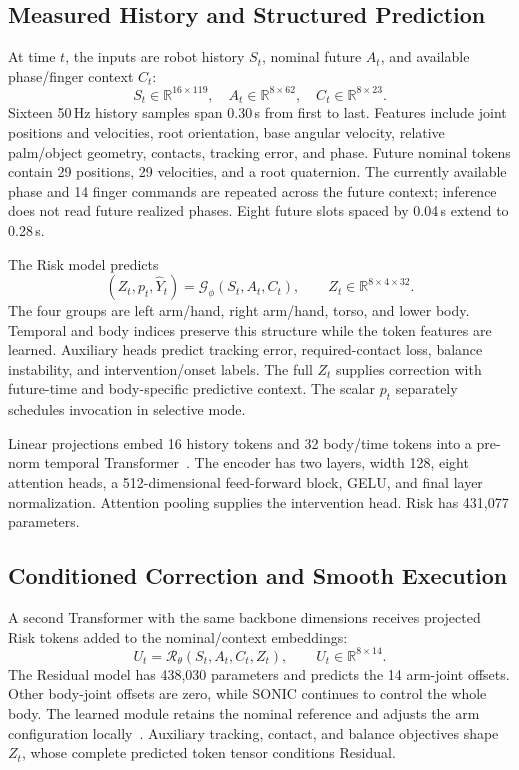 \documentclass[letterpaper,10pt,conference]{ieeeconf}
\newcommand{\Risk}{\mathcal{G}_{\phi}}
\newcommand{\Res}{\mathcal{R}_{\theta}}
\begin{document}
\subsection{Measured History and Structured Prediction}
At time $t$, the inputs are robot history $S_t$, nominal future $A_t$, and available phase/finger context $C_t$:
\begin{equation}
 S_t\in\mathbb{R}^{16\times119},\quad
 A_t\in\mathbb{R}^{8\times62},\quad
 C_t\in\mathbb{R}^{8\times23}.
\end{equation}
Sixteen 50\,Hz history samples span 0.30\,s from first to last. Features include joint positions and velocities, root orientation, base angular velocity, relative palm/object geometry, contacts, tracking error, and phase. Future nominal tokens contain 29 positions, 29 velocities, and a root quaternion. The currently available phase and 14 finger commands are repeated across the future context; inference does not read future realized phases. Eight future slots spaced by 0.04\,s extend to 0.28\,s.

The Risk model predicts
\begin{equation}
 (Z_t,p_t,\widehat{Y}_t)=\Risk(S_t,A_t,C_t),\qquad
 Z_t\in\mathbb{R}^{8\times4\times32}.
 \label{eq:risk}
\end{equation}
The four groups are left arm/hand, right arm/hand, torso, and lower body. Temporal and body indices preserve this structure while the token features are learned. Auxiliary heads predict tracking error, required-contact loss, balance instability, and intervention/onset labels. The full $Z_t$ supplies correction with future-time and body-specific predictive context. The scalar $p_t$ separately schedules invocation in selective mode.

Linear projections embed 16 history tokens and 32 body/time tokens into a pre-norm temporal Transformer~\cite{transformer}. The encoder has two layers, width 128, eight attention heads, a 512-dimensional feed-forward block, GELU, and final layer normalization. Attention pooling supplies the intervention head. Risk has 431,077 parameters.

\subsection{Conditioned Correction and Smooth Execution}
A second Transformer with the same backbone dimensions receives projected Risk tokens added to the nominal/context embeddings:
\begin{equation}
 U_t=\Res(S_t,A_t,C_t,Z_t),\qquad U_t\in\mathbb{R}^{8\times14}.
\end{equation}
The Residual model has 438,030 parameters and predicts the 14 arm-joint offsets. Other body-joint offsets are zero, while SONIC continues to control the whole body. The learned module retains the nominal reference and adjusts the arm configuration locally~\cite{residual}. Auxiliary tracking, contact, and balance objectives shape $Z_t$, whose complete predicted token tensor conditions Residual.
\end{document}
